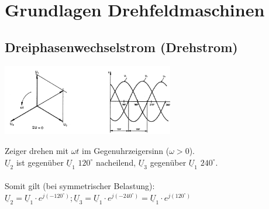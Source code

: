 \section{Grundlagen Drehfeldmaschinen}
    \subsection{Dreiphasenwechselstrom (Drehstrom)}
        \begin{minipage}{8cm}
            \includegraphics[width=7.5cm]{images/Drehstrom.png}
        \end{minipage}
        \begin{minipage}{10cm}
            Zeiger drehen mit $\omega t$ im Gegenuhrzeigersinn ($\omega > 0$). \\
            $\underline{U}_2$ ist gegenüber $\underline{U}_1$ $120^{\circ}$ nacheilend, $\underline{U}_3$ gegenüber $\underline{U}_1$ $240^{\circ}$.\\
            \\
            Somit gilt (bei symmetrischer Belastung): \\
            $\underline{U}_2 = \underline{U}_1 \cdot e^{j (-120^{\circ})}; \underline{U}_3 = \underline{U}_1 \cdot e^{j (-240^{\circ})} = \underline{U}_1 \cdot e^{j (120^{\circ})}$
        \end{minipage}
